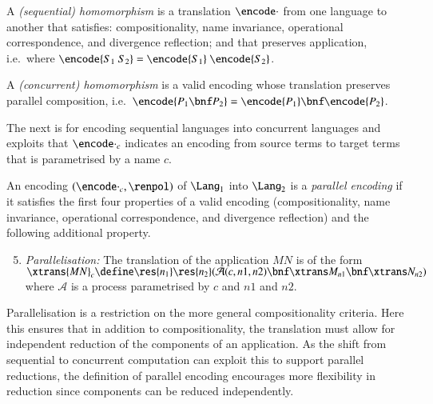 \documentclass{llncs}
\begin{document}
\begin{definition}
\label{def:homo-seq}
A {\em (sequential) homomorphism} is
a translation $\encode\cdot$ from one language to another that satisfies:
compositionality, name invariance, operational correspondence, and divergence reflection;
and that preserves application, i.e.~where $\encode {S_1~S_2} = \encode{S_1}~\encode{S_2}$.
\end{definition}

\begin{definition}
\label{def:homo-con}
A {\em (concurrent) homomorphism} is a valid encoding whose translation preserves parallel composition,
i.e.~$\encode {P_1\bnf P_2}=\encode {P_1}\bnf \encode {P_2}$.
\end{definition}

The next is for encoding sequential languages into concurrent languages and
exploits
that $\encode\cdot _c$ indicates
an encoding from source terms to target terms that is parametrised by a name $c$.

\begin{definition}
\label{def:pe}
An encoding $(\encode\cdot_c,\renpol)$ of $\Lang_1$ into $\Lang_2$
is a {\em parallel encoding} if it satisfies the first four properties of a valid encoding
(compositionality, name invariance, operational correspondence, 
and divergence reflection)
and the following additional property.
\begin{enumerate}
\setcounter{enumi}{4}
\item {\em Parallelisation:} 
      The translation of the application $MN$ is of the form
      $\xtrans {MN} _c \define \res {n_1} \res {n_2} (
        {\mathcal A}(c,n1,n2)\bnf \xtrans M _{n1} \bnf \xtrans N _{n2})$
      where ${\mathcal A}$ is a process parametrised by $c$ and $n1$ and $n2$.
\end{enumerate}
\end{definition}


Parallelisation is a restriction on the more general compositionality criteria.
Here this ensures that in addition to compositionality, the translation must allow
for independent reduction of the components of an application.
As the shift from sequential to concurrent computation can exploit this to support parallel
reductions, the definition of parallel encoding 
encourages more flexibility in reduction since components can be reduced independently.
\end{document}
